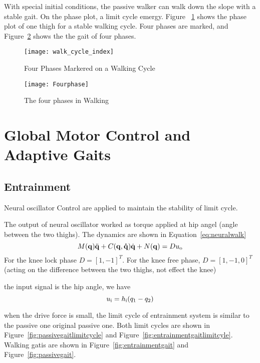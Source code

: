 With special initial conditions, the passive walker can walk down the slope with a stable gait.
On the phase plot,  a limit cycle emergy. 
Figure ~\ref{fig:phasesmaker} shows the phase plot of one thigh for a stable walking cycle.
Four phases are marked, and Figure~\ref{fig:fwalkingphase} shows the the gait of four phases.

\begin{figure}[!htbp]
  \begin{center}
    \texttt{[image: walk\_cycle\_index]}
    \caption{Four Phases Markered on a Walking Cycle}
    \label{fig:phasesmaker}
\end{center}
\end{figure}

\begin{figure}[!htbp]
  \begin{center}
      \texttt{[image: Fourphase]}
    \caption{The four phases in Walking}
    \label{fig:fwalkingphase}
\end{center}
\end{figure}








\section{Global Motor Control and Adaptive Gaits}

\subsection{Entrainment}
Neural oscillator Control  are applied to maintain the stability of limit cycle.

The output of neural oscillator worked as torque applied at hip angel (angle between the two thighs).
The dynamics are shown in Equation~\ref{eq:neuralwalk}
\begin{equation}
\label{eq:neuralwalk}
M(\mathbf{q}) \ddot{\mathbf{q}} + C(\mathbf{q,\dot{q}})\dot{\mathbf{q}} + N(\mathbf{q}) = Du_{\mathrm{o}}
\end{equation}
For the knee lock phase $D=[1,-1]^T$.
For the knee free phase, $D=[1,-1,0]^T$(acting on the difference between the two thighs, not effect the knee)

the input signal is the hip angle,
we have 
\[
	u_{\mathrm{i}}=h_{\mathrm{i}}(q_1-q_2)
\]

when the drive force is small, the limit cycle of entrainment system is similar to the passive one original passive one.
Both limit cycles are shown in Figure~\ref{fig:passivegaitlimitcycle} and Figure~\ref{fig:entrainmentgaitlimitcyle}.
Walking gatis are shown in Figure~\ref{fig:entrainmentgait} and Figure~\ref{fig:passivegait}.




